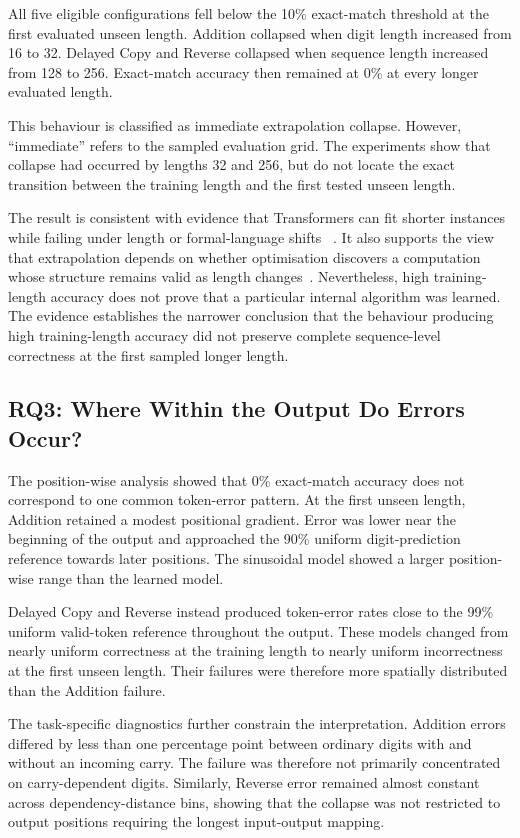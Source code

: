 \documentclass[
    author={Aanchala Ravindra Bhongade},
    supervisor={Dr. Fernando Moreno-Pino},
    degree={MSc},
    title={Length Generalisation in Transformer-Based Sequence Models: Failure Taxonomy and Mitigation Strategies},
    subtitle={},
    type={},
    year={2026}
]{dissertation}
\begin{document}
All five eligible configurations fell below the 10\% exact-match threshold at the first evaluated unseen length. Addition collapsed when digit length increased from 16 to 32. Delayed Copy and Reverse collapsed when sequence length increased from 128 to 256. Exact-match accuracy then remained at 0\% at every longer evaluated length.

This behaviour is classified as immediate extrapolation collapse. However, ``immediate'' refers to the sampled evaluation grid. The experiments show that collapse had occurred by lengths 32 and 256, but do not locate the exact transition between the training length and the first tested unseen length.

The result is consistent with evidence that Transformers can fit shorter instances while failing under length or formal-language shifts
~\cite{varis2021lengthdomain,bhattamishra2020formal,
anil2022exploring}. It also supports the view that extrapolation depends on whether optimisation discovers a computation whose structure remains valid as length changes~\cite{zhou2024algorithms}.
Nevertheless, high training-length accuracy does not prove that a particular internal algorithm was learned. The evidence establishes the narrower conclusion that the behaviour producing high training-length accuracy did not preserve complete sequence-level correctness at the first sampled longer length.

\subsection{RQ3: Where Within the Output Do Errors Occur?}

The position-wise analysis showed that 0\% exact-match accuracy does not correspond to one common token-error pattern. At the first unseen length, Addition retained a modest positional gradient. Error was lower near the beginning of the output and approached the 90\% uniform digit-prediction reference towards later positions. The sinusoidal model showed a larger position-wise range than the learned model.

Delayed Copy and Reverse instead produced token-error rates close to the 99\% uniform valid-token reference throughout the output. These models changed from nearly uniform correctness at the training length to nearly uniform incorrectness at the first unseen length. Their failures were therefore more spatially distributed than the Addition failure.

The task-specific diagnostics further constrain the interpretation. Addition errors differed by less than one percentage point between ordinary digits with and without an incoming carry. The failure was therefore not primarily concentrated on carry-dependent digits. Similarly, Reverse error remained almost constant across dependency-distance bins, showing that the collapse was not restricted to output positions requiring the longest input-output mapping.
\end{document}
